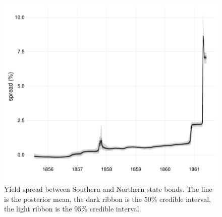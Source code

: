 \documentclass[]{article}\usepackage[]{graphicx}\usepackage[]{color}
\begin{document}
\begin{figure}
  \centering
  \includegraphics[width=\textwidth]{./figures/fig_north_south_spreads-1}
\caption[Yield spread between Southern and Northern state bonds]{
  Yield spread between Southern and Northern state bonds.
  The line is the posterior mean, the dark ribbon is the 50\% credible interval, the light ribbon is the 95\% credible interval.
}
\label{fig:north_south_spreads}
\end{figure}
\end{document}
